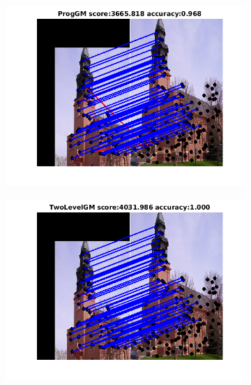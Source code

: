 \documentclass[
	fontsize=12pt,
	paper=a4,
	twoside=false,
	numbers=noenddot,
	plainheadsepline,
	toc=listof,
	toc=bibliography
]{scrartcl}
\begin{document}
\begin{figure}[h]
	\begin{subfigure}[b]{0.3\textwidth}
		\centering
		\includegraphics[scale=0.4]{"fig_ver2608/RealImages/Img_trafo/no_descr/using_cdf_afftrafo/fi_4_ProgGM"} 
	\end{subfigure}%
	\begin{subfigure}[b]{0.3\textwidth}
		\centering
		\includegraphics[scale=0.4]{"fig_ver2608/RealImages/Img_trafo/no_descr/using_cdf_afftrafo/fi_4_2lGM"} 
	\end{subfigure} 
	\begin{subfigure}[b]{0.3\textwidth}
		\centering

\end{subfigure}
\end{figure}
\end{document}
